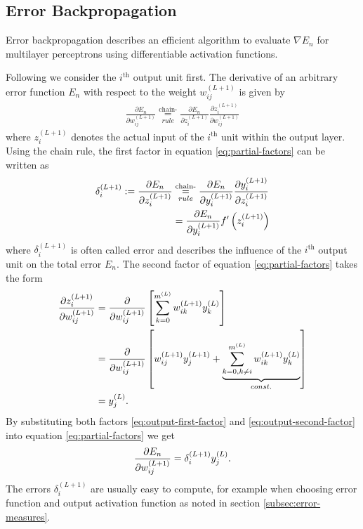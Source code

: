 \subsection{Error Backpropagation}
\label{subsec:error-backpropagation}

Error backpropagation describes an efficient algorithm to evaluate $\nabla E_n$ for multilayer perceptrons using differentiable activation functions.

Following \cite[p.~241-245]{Bishop:2006} we consider the $i^\text{th}$ output unit first. The derivative of an arbitrary error function $E_n$ with respect to the weight $w_{ij}^{(L+1)}$ is given by
\begin{align}
\label{eq:partial-factors}
\frac{\partial E_n}{\partial w_{ij}^{(L+1)}} \underset{rule}{\overset{\text{chain-}}{=}} \frac{\partial E_n}{\partial z_i^{(L+1)}} \frac{\partial z_i^{(L+1)}}{\partial w_{ij}^{(L+1)}}
\end{align}
where $z_i^{(L+1)}$ denotes the actual input of the $i^\text{th}$ unit within the output layer. Using the chain rule, the first factor in equation \eqref{eq:partial-factors} can be written as
\begin{align}
\label{eq:output-first-factor}
\delta _i ^{(L+1)} := \frac{\partial E_n}{\partial z_i^{(L+1)}} & \underset{rule}{\overset{\text{chain-}}{=}} \frac{\partial E_n}{\partial y_i^{(L+1)}} \frac{\partial y_i^{(L+1)}}{\partial z_i^{(L+1)}}\notag\\
& = \frac{\partial E_n}{\partial y_i^{(L+1)}} f'\left(z_i^{(L+1)}\right)
\end{align}
where $\delta _i ^{(L+1)}$ is often called error and describes the influence of the $i^\text{th}$ output unit on the total error $E_n$. The second factor of equation \eqref{eq:partial-factors} takes the form
\begin{align}
\label{eq:output-second-factor}
\frac{\partial z_i^{(L+1)}}{\partial w_{ij}^{(L+1)}}
& = \frac{\partial}{\partial w_{ij}^{(L+1)}} \left[\sum _{k = 0} ^{m^{(L)}} w_{ik}^{(L+1)}y_k^{(L)}\right]\notag\\
& = \frac{\partial}{\partial w_{ij} ^{(L+1)}} \left[w_{ij}^{(L+1)}y_j^{(L+1)} + \underbrace{\sum _{k = 0, k \neq i} ^{m^{(L)}} w_{ik}^{(L+1)} y_k^{(L)}}_{const.}\right]\notag\\
& =  y_j^{(L)}\onedot
\end{align}
By substituting both factors \eqref{eq:output-first-factor} and \eqref{eq:output-second-factor} into equation \eqref{eq:partial-factors} we get
\begin{align}
\label{eq:derivative}
\frac{\partial E_n}{\partial w_{ij}^{(L+1)}} = \delta _i^{(L+1)} y_j^{(L)}\onedot
\end{align}
The errors $\delta_i ^{(L+1)}$ are usually easy to compute, for example when choosing error function and output activation function as noted in section \ref{subsec:error-measures}.

